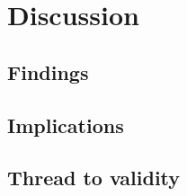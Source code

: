 \chapter{Discussion\label{chap:discussion}}
    \section{Findings\label{sec:findings}}
    
    
    
    
    
    

    \section{Implications\label{sec:implications}}
    
    \section{Thread to validity\label{sec:validity}}
